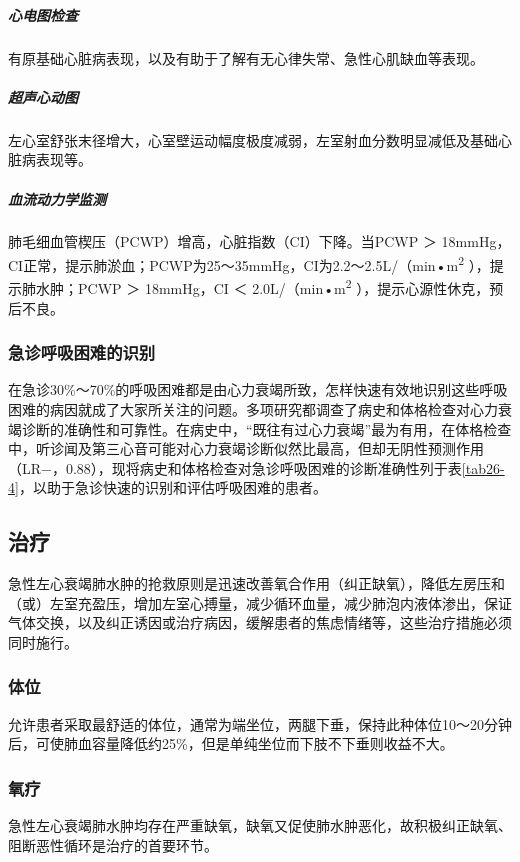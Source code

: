 \subparagraph{心电图检查}

有原基础心脏病表现，以及有助于了解有无心律失常、急性心肌缺血等表现。

\subparagraph{超声心动图}

左心室舒张末径增大，心室壁运动幅度极度减弱，左室射血分数明显减低及基础心脏病表现等。

\subparagraph{血流动力学监测}

肺毛细血管楔压（PCWP）增高，心脏指数（CI）下降。当PCWP ＞
18mmHg，CI正常，提示肺淤血；PCWP为25～35mmHg，CI为2.2～2.5L/（min•m\textsuperscript{2}
），提示肺水肿；PCWP ＞ 18mmHg，CI ＜ 2.0L/（min•m\textsuperscript{2}
），提示心源性休克，预后不良。

\subsubsection{急诊呼吸困难的识别}

在急诊30\%～70\%的呼吸困难都是由心力衰竭所致，怎样快速有效地识别这些呼吸困难的病因就成了大家所关注的问题。多项研究都调查了病史和体格检查对心力衰竭诊断的准确性和可靠性。在病史中，“既往有过心力衰竭”最为有用，在体格检查中，听诊闻及第三心音可能对心力衰竭诊断似然比最高，但却无阴性预测作用（LR−，0.88），现将病史和体格检查对急诊呼吸困难的诊断准确性列于表\ref{tab26-4}，以助于急诊快速的识别和评估呼吸困难的患者。

\subsection{治疗}

急性左心衰竭肺水肿的抢救原则是迅速改善氧合作用（纠正缺氧），降低左房压和（或）左室充盈压，增加左室心搏量，减少循环血量，减少肺泡内液体渗出，保证气体交换，以及纠正诱因或治疗病因，缓解患者的焦虑情绪等，这些治疗措施必须同时施行。

\subsubsection{体位}

允许患者采取最舒适的体位，通常为端坐位，两腿下垂，保持此种体位10～20分钟后，可使肺血容量降低约25\%，但是单纯坐位而下肢不下垂则收益不大。

\subsubsection{氧疗}

急性左心衰竭肺水肿均存在严重缺氧，缺氧又促使肺水肿恶化，故积极纠正缺氧、阻断恶性循环是治疗的首要环节。

